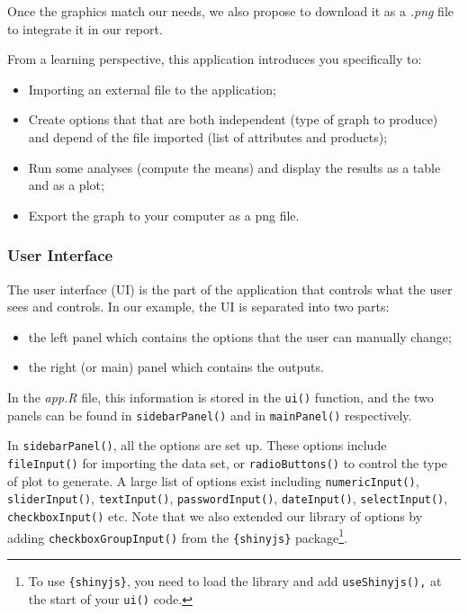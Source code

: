 \documentclass[
]{book}
\providecommand{\tightlist}{%
  \setlength{\itemsep}{0pt}\setlength{\parskip}{0pt}}
\begin{document}
Once the graphics match our needs, we also propose to download it as a \emph{.png} file to integrate it in our report.

From a learning perspective, this application introduces you specifically to:

\begin{itemize}
\tightlist
\item
  Importing an external file to the application;
\item
  Create options that that are both independent (type of graph to produce) and depend of the file imported (list of attributes and products);
\item
  Run some analyses (compute the means) and display the results as a table and as a plot;
\item
  Export the graph to your computer as a png file.
\end{itemize}

\hypertarget{user-interface}{%
\subsubsection{User Interface}\label{user-interface}}

The user interface (UI) is the part of the application that controls what the user sees and controls.
In our example, the UI is separated into two parts:

\begin{itemize}
\tightlist
\item
  the left panel which contains the options that the user can manually change;
\item
  the right (or main) panel which contains the outputs.
\end{itemize}

In the \emph{app.R} file, this information is stored in the \texttt{ui()} function, and the two panels can be found in \texttt{sidebarPanel()} and in \texttt{mainPanel()} respectively.

In \texttt{sidebarPanel()}, all the options are set up. These options include \texttt{fileInput()} for importing the data set, or \texttt{radioButtons()} to control the type of plot to generate. A large list of options exist including \texttt{numericInput()}, \texttt{sliderInput()}, \texttt{textInput()}, \texttt{passwordInput()}, \texttt{dateInput()}, \texttt{selectInput()}, \texttt{checkboxInput()} etc. Note that we also extended our library of options by adding \texttt{checkboxGroupInput()} from the \texttt{\{shinyjs\}} package\footnote{To use \texttt{\{shinyjs\}}, you need to load the library and add \texttt{useShinyjs(),} at the start of your \texttt{ui()} code.}.
\end{document}
